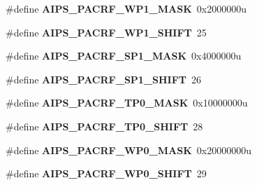 \begin{DoxyCompactItemize}
\item 
\hypertarget{group___a_i_p_s___register___masks_ga02da010889ce203dd0750604ca9cd428}{}\#define {\bfseries A\+I\+P\+S\+\_\+\+P\+A\+C\+R\+F\+\_\+\+W\+P1\+\_\+\+M\+A\+S\+K}~0x2000000u\label{group___a_i_p_s___register___masks_ga02da010889ce203dd0750604ca9cd428}

\item 
\hypertarget{group___a_i_p_s___register___masks_gafb837c25b68ce7a946e445b28abd3456}{}\#define {\bfseries A\+I\+P\+S\+\_\+\+P\+A\+C\+R\+F\+\_\+\+W\+P1\+\_\+\+S\+H\+I\+F\+T}~25\label{group___a_i_p_s___register___masks_gafb837c25b68ce7a946e445b28abd3456}

\item 
\hypertarget{group___a_i_p_s___register___masks_gaf2e1b7d278d5b80aa9eb53c725050e6e}{}\#define {\bfseries A\+I\+P\+S\+\_\+\+P\+A\+C\+R\+F\+\_\+\+S\+P1\+\_\+\+M\+A\+S\+K}~0x4000000u\label{group___a_i_p_s___register___masks_gaf2e1b7d278d5b80aa9eb53c725050e6e}

\item 
\hypertarget{group___a_i_p_s___register___masks_gae4c490d4d315696d08ddb17129673f09}{}\#define {\bfseries A\+I\+P\+S\+\_\+\+P\+A\+C\+R\+F\+\_\+\+S\+P1\+\_\+\+S\+H\+I\+F\+T}~26\label{group___a_i_p_s___register___masks_gae4c490d4d315696d08ddb17129673f09}

\item 
\hypertarget{group___a_i_p_s___register___masks_ga29803aa48ee5f63ae66a7d8caae448cb}{}\#define {\bfseries A\+I\+P\+S\+\_\+\+P\+A\+C\+R\+F\+\_\+\+T\+P0\+\_\+\+M\+A\+S\+K}~0x10000000u\label{group___a_i_p_s___register___masks_ga29803aa48ee5f63ae66a7d8caae448cb}

\item 
\hypertarget{group___a_i_p_s___register___masks_ga0662391ff7ae560bf6366f017d3b9ff5}{}\#define {\bfseries A\+I\+P\+S\+\_\+\+P\+A\+C\+R\+F\+\_\+\+T\+P0\+\_\+\+S\+H\+I\+F\+T}~28\label{group___a_i_p_s___register___masks_ga0662391ff7ae560bf6366f017d3b9ff5}

\item 
\hypertarget{group___a_i_p_s___register___masks_ga3059ddbcdb481c14c1c4475f0c7a2187}{}\#define {\bfseries A\+I\+P\+S\+\_\+\+P\+A\+C\+R\+F\+\_\+\+W\+P0\+\_\+\+M\+A\+S\+K}~0x20000000u\label{group___a_i_p_s___register___masks_ga3059ddbcdb481c14c1c4475f0c7a2187}

\item 
\hypertarget{group___a_i_p_s___register___masks_ga196be9f32f99dc87fb5f465c9a0a8491}{}\#define {\bfseries A\+I\+P\+S\+\_\+\+P\+A\+C\+R\+F\+\_\+\+W\+P0\+\_\+\+S\+H\+I\+F\+T}~29\label{group___a_i_p_s___register___masks_ga196be9f32f99dc87fb5f465c9a0a8491}


\end{DoxyCompactItemize}
